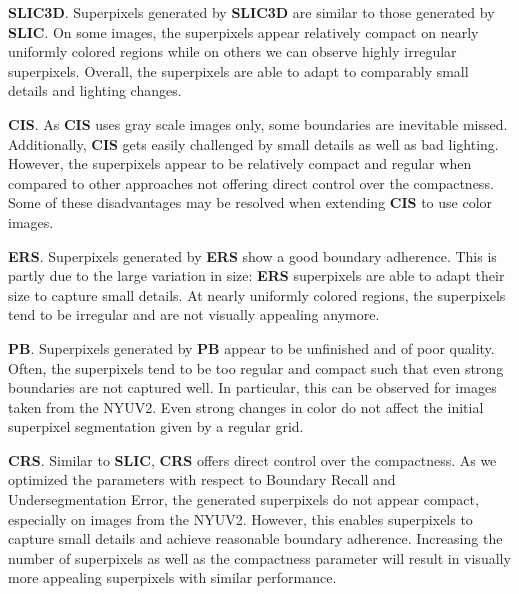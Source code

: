 \textbf{SLIC3D}. Superpixels generated by \textbf{SLIC3D} are similar to those generated by \textbf{SLIC}. On some images, the superpixels appear relatively compact on nearly uniformly colored regions while on others we can observe highly irregular superpixels. Overall, the superpixels are able to adapt to comparably small details and lighting changes.

\textbf{CIS}. As \textbf{CIS} uses gray scale images only, some boundaries are inevitable missed. Additionally, \textbf{CIS} gets easily challenged by small details as well as bad lighting. However, the superpixels appear to be relatively compact and regular when compared to other approaches not offering direct control over the compactness. Some of these disadvantages may be resolved when extending \textbf{CIS} to use color images.

\textbf{ERS}. Superpixels generated by \textbf{ERS} show a good boundary adherence. This is partly due to the large variation in size: \textbf{ERS} superpixels are able to adapt their size to capture small details. At nearly uniformly colored regions, the superpixels tend to be irregular and are not visually appealing anymore.

\textbf{PB}. Superpixels generated by \textbf{PB} appear to be unfinished and of poor quality. Often, the superpixels tend to be too regular and compact such that even strong boundaries are not captured well. In particular, this can be observed for images taken from the NYUV2. Even strong changes in color do not affect the initial superpixel segmentation given by a regular grid.

\textbf{CRS}. Similar to \textbf{SLIC}, \textbf{CRS} offers direct control over the compactness. As we optimized the parameters with respect to Boundary Recall and Undersegmentation Error, the generated superpixels do not appear compact, especially on images from the NYUV2. However, this enables superpixels to capture small details and achieve reasonable boundary adherence. Increasing the number of superpixels as well as the compactness parameter will result in visually more appealing superpixels with similar performance.

